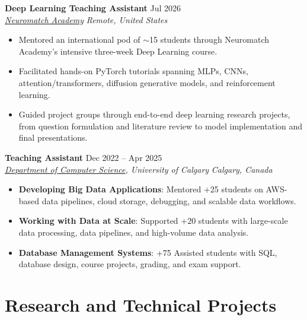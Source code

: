 \documentclass[a4paper,10pt]{article}
\newcommand{\resumeSubheading}[4]{
    \textbf{#1} \hfill #2 \\
    \textit{#3} \hfill \textit{#4}
}
\begin{document}
\resumeSubheading
{Deep Learning Teaching Assistant}
{Jul 2026}
{\href{https://neuromatch.io/}{Neuromatch Academy}}
{Remote, United States}
\begin{itemize}[leftmargin=0.25in]
    \item Mentored an international pod of $\sim$15 students through Neuromatch Academy's intensive three-week Deep Learning course.
    \item Facilitated hands-on PyTorch tutorials spanning MLPs, CNNs, attention/transformers, diffusion generative models, and reinforcement learning.
    \item Guided project groups through end-to-end deep learning research projects, from question formulation and literature review to model implementation and final presentations.
\end{itemize}

\resumeSubheading
{Teaching Assistant}
{Dec 2022 -- Apr 2025}
{\href{https://science.ucalgary.ca/computer-science} {Department of Computer Science}, University of Calgary}
{Calgary, Canada}
\begin{itemize}[leftmargin=0.25in]
    \item \textbf{Developing Big Data Applications}: Mentored +25 students on AWS-based data pipelines, cloud storage, debugging, and scalable data workflows.
    \item \textbf{Working with Data at Scale}: Supported +20 students with large-scale data processing, data pipelines, and high-volume data analysis. 
    \item \textbf{Database Management Systems}: +75 Assisted students with SQL, database design, course projects, grading, and exam support.
\end{itemize}


\section*{Research and Technical Projects}
\end{document}
